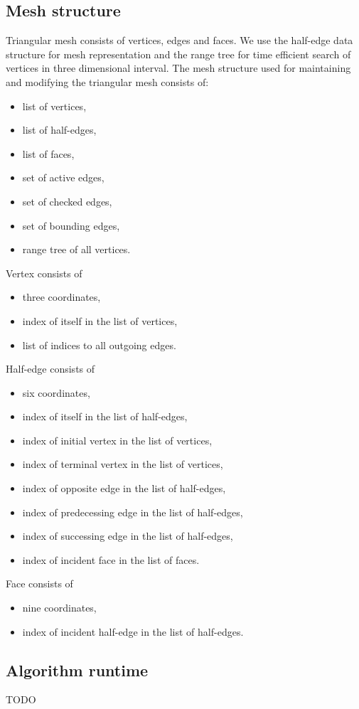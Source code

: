 \subsection{Mesh structure}
Triangular mesh consists of vertices, edges and faces. We use the half-edge 
data structure for mesh representation and the range tree for time efficient
search of vertices in three dimensional interval.
The mesh structure used for maintaining and modifying the triangular mesh
consists of:
\begin{itemize}
    \setlength\itemsep{-2mm}
    \item list of vertices,
    \item list of half-edges,
    \item list of faces,
    \item set of active edges,
    \item set of checked edges,
    \item set of bounding edges,
    \item range tree of all vertices.
\end{itemize}
Vertex consists of 
\begin{itemize}
    \setlength\itemsep{-2mm}
    \item three coordinates,
    \item index of itself in the list of vertices,
    \item list of indices to all outgoing edges.
\end{itemize}
Half-edge consists of 
\begin{itemize}
    \setlength\itemsep{-2mm}
    \item six coordinates,
    \item index of itself in the list of half-edges,
    \item index of initial vertex in the list of vertices, 
    \item index of terminal vertex in the list of vertices,
    \item index of opposite edge in the list of half-edges,
    \item index of predecessing edge in the list of half-edges,
    \item index of successing edge in the list of half-edges,
    \item index of incident face in the list of faces.
\end{itemize}
Face consists of
\begin{itemize}
    \setlength\itemsep{-2mm}
    \item nine coordinates,
    \item index of incident half-edge in the list of half-edges.
\end{itemize}

\subsection{Algorithm runtime}
TODO
